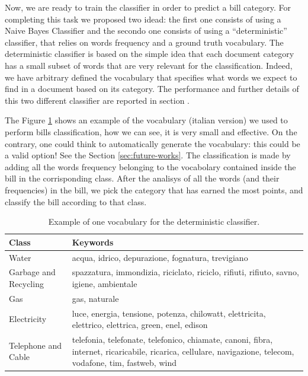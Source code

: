 \documentclass[10pt,twocolumn,letterpaper]{article}
\begin{document}
Now, we are ready to train the classifier in order to predict a bill
category. For completing this task we proposed two idead: the first one consists of using a Naive Bayes Classifier and the secondo one consists of using a ``deterministic''
classifier, that relies on words frequency and a ground truth
vocabulary. The deterministic classifier is based on the simple idea that each
document category has a small subset of words that are very relevant
for the classification. Indeed, we have arbitrary defined the
vocabulary that specifies what words we expect to find in a document
based on its category. The performance and further details of this two different classifier are reported in section
\label{subsec:classification-naive-bayes}.

The Figure \ref{table:determnistic-classifier-dict} shows an example
of the vocabulary (italian version) we used to perform bills
classification, how we can see, it is very small and effective.
On the contrary, one could think to automatically generate the
vocabulary: this could be a valid option! See the Section
\ref{sec:future-works}.
The classification is made by adding all the words frequency belonging to the vocabolary contained inside the bill in the corrisponding class. After the analisys of all the words (and their frequencies) in the bill, we pick the category that has earned the most points, and classify the bill according to that class.

\bgroup
\def\arraystretch{1.3}%
\begin{table}[!h]
  \begin{center}
    \begin{tabular}{p{2cm} p{5cm}}
      \hline
      Class & Keywords \\ \hline
      Water & acqua, idrico, depurazione, fognatura, trevigiano \\
      Garbage and Recycling & spazzatura, immondizia, riciclato, riciclo, rifiuti, rifiuto, savno, igiene, ambientale\\
      Gas & gas, naturale \\
      Electricity & luce, energia, tensione, potenza, chilowatt, elettricita, elettrico, elettrica, green, enel, edison \\
      Telephone and Cable & telefonia, telefonate, telefonico, chiamate, canoni, fibra, internet, ricaricabile, ricarica, cellulare, navigazione, telecom, vodafone, tim, fastweb, wind \\ \hline
    \end{tabular}
  \end{center}
  \label{table:determnistic-classifier-dict}
  \caption{Example of one vocabulary for the deterministic classifier.}
\end{table}
\egroup
\end{document}
